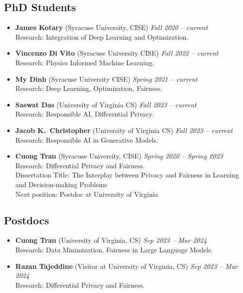 
\subsection*{PhD Students}
\begin{itemize}
  \item \textbf{James Kotary} ({\sc Syracuse University}, CISE) 
  \hfill{\em Fall 2020 -- current}\\
  {\sc Research}: Integration of Deep Learning and Optimization.

  \item \textbf{Vincenzo Di Vito} ({\sc Syracuse University} CISE)
  \hfill{\em Fall 2022 -- current}\\
  {\sc Research:} Physics Informed Machine Learning.
  
  \item \textbf{My Dinh} ({\sc Syracuse University} CISE) 
  \hfill{\em Spring 2021 -- current}\\
  {\sc Research}: Deep Learning, Optimization, Fairness.

  \item \textbf{Saswat Das} ({\sc University of Virginia} CS)
  \hfill{\em Fall 2023 -- current}\\
  {\sc Research:} Responsible AI, Differential Privacy.

  \item \textbf{Jacob K.~Christopher} ({\sc University of Virginia} CS)
  \hfill{\em Fall 2023 -- current}\\
  {\sc Research:} Responsible AI in Generative Models.

  \item \textbf{Cuong Tran} ({\sc Syracuse University}, CISE) 
  \hfill{\em Spring 2020 -- Spring 2023}\\
  {\sc Research}: Differential Privacy and Fairness.\\
  {\sc Dissertation Title:} The Interplay between Privacy and Fairness in
  Learning and Decision-making Problems\\
  {\sc Next position:} Postdoc at University of Virginia 
\end{itemize}
\medskip

\subsection*{Postdocs}
\begin{itemize}
    \item \textbf{Cuong Tran} ({\sc University of Virginia}, CS) 
  \hfill{\em Sep 2023 -- Mar 2024}\\
  {\sc Research}: Data Minimization, Fairness in Large Language Models.

    \item \textbf{Razan Tajeddine} ({\sc Visitor at University of Virginia}, CS) 
  \hfill{\em Sep 2023 -- Mar 2024}\\
  {\sc Research}: Differential Privacy and Fairness.
\end{itemize}

